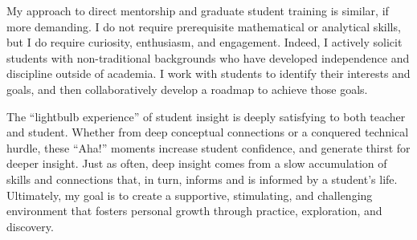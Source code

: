 \documentclass[12pt]{article}
\begin{document}
My approach to direct mentorship and graduate student
training is similar, if more demanding. I do not
require prerequisite mathematical or analytical skills,
but I do require curiosity, enthusiasm, and engagement.
Indeed, I actively solicit students with 
non-traditional backgrounds who have developed 
independence and discipline outside of academia.
I work with students to identify their interests 
and goals, and then collaboratively develop a roadmap 
to achieve those goals.

The ``lightbulb experience'' of student insight is 
deeply satisfying to both teacher and student. 
Whether from deep conceptual connections or a conquered
technical hurdle, these ``Aha!'' moments
increase student confidence, and generate thirst for 
deeper insight.  Just as often, deep insight comes 
from a slow accumulation of skills and connections that, 
in turn, informs and is informed by a student's life.  
Ultimately, my goal is to create a supportive, stimulating,
and challenging environment that fosters personal growth 
through practice, exploration, and discovery.
\end{document}

